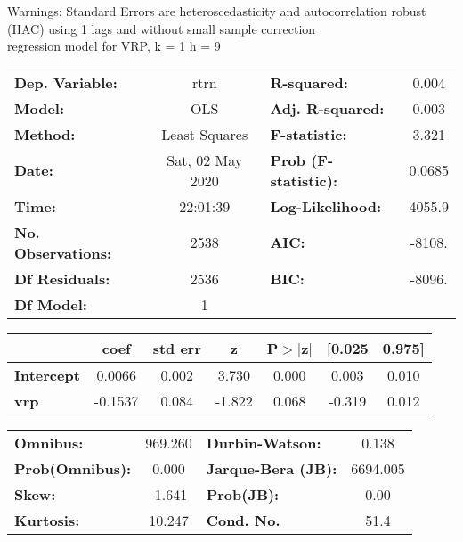 Warnings: \newline
 [1] Standard Errors are heteroscedasticity and autocorrelation robust (HAC) using 1 lags and without small sample correction\\ 

regression model for VRP, k = 1 h = 9\begin{center}
\begin{tabular}{lclc}
\toprule
\textbf{Dep. Variable:}    &       rtrn       & \textbf{  R-squared:         } &     0.004   \\
\textbf{Model:}            &       OLS        & \textbf{  Adj. R-squared:    } &     0.003   \\
\textbf{Method:}           &  Least Squares   & \textbf{  F-statistic:       } &     3.321   \\
\textbf{Date:}             & Sat, 02 May 2020 & \textbf{  Prob (F-statistic):} &   0.0685    \\
\textbf{Time:}             &     22:01:39     & \textbf{  Log-Likelihood:    } &    4055.9   \\
\textbf{No. Observations:} &        2538      & \textbf{  AIC:               } &    -8108.   \\
\textbf{Df Residuals:}     &        2536      & \textbf{  BIC:               } &    -8096.   \\
\textbf{Df Model:}         &           1      & \textbf{                     } &             \\
\bottomrule
\end{tabular}
\begin{tabular}{lcccccc}
                   & \textbf{coef} & \textbf{std err} & \textbf{z} & \textbf{P$> |$z$|$} & \textbf{[0.025} & \textbf{0.975]}  \\
\midrule
\textbf{Intercept} &       0.0066  &        0.002     &     3.730  &         0.000        &        0.003    &        0.010     \\
\textbf{vrp}       &      -0.1537  &        0.084     &    -1.822  &         0.068        &       -0.319    &        0.012     \\
\bottomrule
\end{tabular}
\begin{tabular}{lclc}
\textbf{Omnibus:}       & 969.260 & \textbf{  Durbin-Watson:     } &    0.138  \\
\textbf{Prob(Omnibus):} &   0.000 & \textbf{  Jarque-Bera (JB):  } & 6694.005  \\
\textbf{Skew:}          &  -1.641 & \textbf{  Prob(JB):          } &     0.00  \\
\textbf{Kurtosis:}      &  10.247 & \textbf{  Cond. No.          } &     51.4  \\
\bottomrule
\end{tabular}
\end{center}

